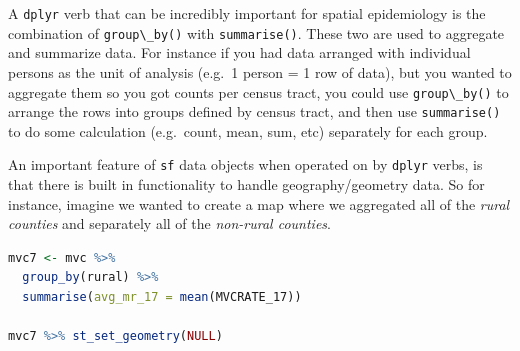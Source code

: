 \documentclass[
]{book}
\newcommand{\passthrough}[1]{#1}
\begin{document}
A \passthrough{\lstinline!dplyr!} verb that can be incredibly important for spatial epidemiology is the combination of \passthrough{\lstinline!group\_by()!} with \passthrough{\lstinline!summarise()!}. These two are used to aggregate and summarize data. For instance if you had data arranged with individual persons as the unit of analysis (e.g.~1 person = 1 row of data), but you wanted to aggregate them so you got counts per census tract, you could use \passthrough{\lstinline!group\_by()!} to arrange the rows into groups defined by census tract, and then use \passthrough{\lstinline!summarise()!} to do some calculation (e.g.~count, mean, sum, etc) separately for each group.

An important feature of \passthrough{\lstinline!sf!} data objects when operated on by \passthrough{\lstinline!dplyr!} verbs, is that there is built in functionality to handle geography/geometry data. So for instance, imagine we wanted to create a map where we aggregated all of the \emph{rural counties} and separately all of the \emph{non-rural counties}.

\begin{lstlisting}[language=R]
mvc7 <- mvc %>%
  group_by(rural) %>%
  summarise(avg_mr_17 = mean(MVCRATE_17))

mvc7 %>% st_set_geometry(NULL)
\end{lstlisting}

 
  \providecommand{\huxb}[2]{\arrayrulecolor[RGB]{#1}\global\arrayrulewidth=#2pt}
  \providecommand{\huxvb}[2]{\color[RGB]{#1}\vrule width #2pt}
  \providecommand{\huxtpad}[1]{\rule{0pt}{#1}}
  \providecommand{\huxbpad}[1]{\rule[-#1]{0pt}{#1}}
\end{document}
